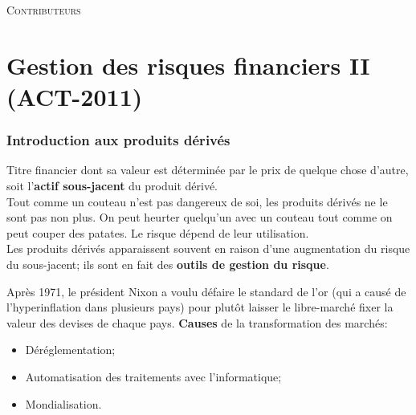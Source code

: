 \documentclass[10pt, french]{article}
\begin{document}
\begin{center}
	\textsc{\Large Contributeurs}\\[0.5cm] 
\end{center}


\newpage
\raggedcolumns

\part{Gestion des risques financiers II (ACT-2011)}
\begin{multicols*}{2}

\section{Introduction aux produits dérivés}

\begin{definitionNOHFILL}
Titre financier dont sa valeur est déterminée par le prix de quelque chose d'autre, soit l'\textbf{actif sous-jacent} du produit dérivé.\\

Tout comme un couteau n'est pas dangereux de soi, les produits dérivés ne le sont pas non plus. On peut heurter quelqu'un avec un couteau tout comme on peut couper des patates. Le risque dépend de leur utilisation.\\

Les produits dérivés apparaissent souvent en raison d'une augmentation du risque du sous-jacent; ils sont en fait des \textbf{outils de gestion du risque}.
\end{definitionNOHFILL}

\begin{rappel_enhanced}[Origine]
Après 1971, le président Nixon a voulu défaire le standard de l'or (qui a causé de l'hyperinflation dans plusieurs pays) pour plutôt laisser le libre-marché fixer la valeur des devises de chaque pays.
\tcbline
\textbf{Causes} de la transformation des marchés:
\begin{itemize}[leftmargin = *]
	\item	Déréglementation;
	\item	Automatisation des traitements avec l'informatique;
	\item	Mondialisation.
\end{itemize}
\end{rappel_enhanced}


\end{multicols*}
\end{document}
